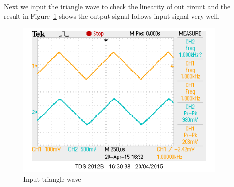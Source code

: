 Next we input the triangle wave to check the linearity of out circuit and the result in Figure~\ref{fig:Input triangle wave} shows the output signal follows input signal very well.

\begin{figure}[htbp]
\centering
\includegraphics[scale=1]{"../Photo/Chap7/1ktriangle"}
\caption{Input triangle wave}
\label{fig:Input triangle wave}
\end{figure}
